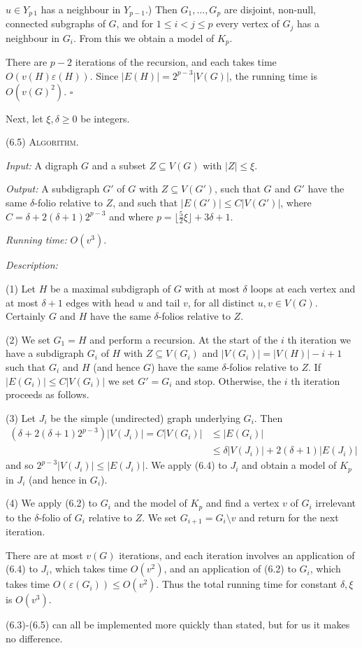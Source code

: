\noindent $u \in Y_{p\ 1}$ has a neighbour in $Y_{p-1}$.) Then $G_1, \dots, G_p$ are disjoint, non-null, connected subgraphs of $G$, and for $1 \le i < j \le p$ every vertex of $G_j$ has a neighbour in $G_i$. From this we obtain a model of $K_p$.

There are $p-2$ iterations of the recursion, and each takes time $O(v(H)\varepsilon(H))$. Since $|E(H)| = 2^{p-3} |V(G)|$, the running time is $O(v(G)^2)$. $\square$

Next, let $\xi, \delta \ge 0$ be integers.

\stmt
(6.5) \textsc{Algorithm}.

\textit{Input:} A digraph $G$ and a subset $Z \subseteq V(G)$ with $|Z| \le \xi$.

\textit{Output:} A subdigraph $G'$ of $G$ with $Z \subseteq V(G')$, such that $G$ and $G'$ have the same $\delta$-folio relative to $Z$, and such that $|E(G')| \le C|V(G')|$, where $C = \delta + 2(\delta+1)2^{p-3}$ and where $p = \lfloor\frac{5}{2}\xi\rfloor + 3\delta + 1$.

\textit{Running time:} $O(v^3)$.

\textit{Description:}

\hspace*{12pt}(1) Let $H$ be a maximal subdigraph of $G$ with at most $\delta$ loops at each vertex and at most $\delta+1$ edges with head $u$ and tail $v$, for all distinct $u, v \in V(G)$. Certainly $G$ and $H$ have the same $\delta$-folios relative to $Z$.

\hspace*{12pt}(2) We set $G_1 = H$ and perform a recursion. At the start of the $i$ th iteration we have a subdigraph $G_i$ of $H$ with $Z \subseteq V(G_i)$ and $|V(G_i)| = |V(H)| - i + 1$ such that $G_i$ and $H$ (and hence $G$) have the same $\delta$-folios relative to $Z$. If $|E(G_i)| \le C|V(G_i)|$ we set $G' = G_i$ and stop. Otherwise, the $i$ th iteration proceeds as follows.

\hspace*{12pt}(3) Let $J_i$ be the simple (undirected) graph underlying $G_i$. Then
\begin{align*}
(\delta + 2(\delta+1)2^{p-3}) |V(J_i)| = C|V(G_i)| &\le |E(G_i)| \\
&\le \delta |V(J_i)| + 2(\delta+1) |E(J_i)|
\end{align*}
and so $2^{p-3} |V(J_i)| \le |E(J_i)|$. We apply (6.4) to $J_i$ and obtain a model of $K_p$ in $J_i$ (and hence in $G_i$).

\hspace*{12pt}(4) We apply (6.2) to $G_i$ and the model of $K_p$ and find a vertex $v$ of $G_i$ irrelevant to the $\delta$-folio of $G_i$ relative to $Z$. We set $G_{i+1} = G_i \setminus v$ and return for the next iteration.

There are at most $v(G)$ iterations, and each iteration involves an application of (6.4) to $J_i$, which takes time $O(v^2)$, and an application of (6.2) to $G_i$, which takes time $O(\varepsilon(G_i)) \le O(v^2)$. Thus the total running time for constant $\delta, \xi$ is $O(v^3)$.

\stmt
(6.3)-(6.5) can all be implemented more quickly than stated, but for us it makes no difference.
